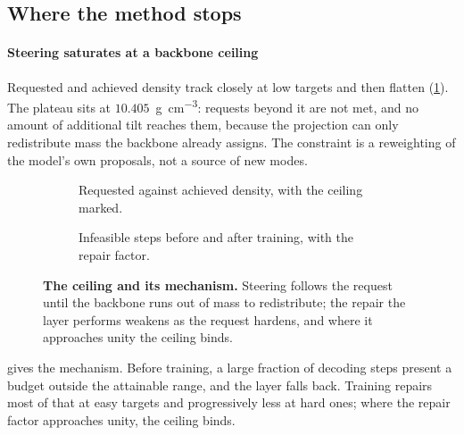 \subsection{Where the method stops}
\label{sec:scope}

\paragraph{Steering saturates at a backbone ceiling}
Requested and achieved density track closely at low targets and then flatten
(\cref{fig:frontier}). The plateau sits at $10.405$~\unit{\gram\per\centi\metre\cubed}:
requests beyond it are not met, and no amount of additional tilt reaches them, because
the projection can only redistribute mass the backbone already assigns. The constraint
is a reweighting of the model's own proposals, not a source of new modes.

\begin{figure}[t]
  \centering
  \begin{subfigure}[t]{0.48\linewidth}
    \caption{Requested against achieved density, with the ceiling marked.}
    \label{fig:frontier}
  \end{subfigure}\hfill
  \begin{subfigure}[t]{0.48\linewidth}
    \caption{Infeasible steps before and after training, with the repair factor.}
    \label{fig:infeas}
  \end{subfigure}
  \caption{\textbf{The ceiling and its mechanism.} Steering follows the request until the
    backbone runs out of mass to redistribute; the repair the layer performs weakens as the
    request hardens, and where it approaches unity the ceiling binds.}
\end{figure}

 gives the mechanism. Before training, a large fraction of decoding
steps present a budget outside the attainable range, and the layer falls back. Training
repairs most of that at easy targets and progressively less at hard ones; where the
repair factor approaches unity, the ceiling binds.

